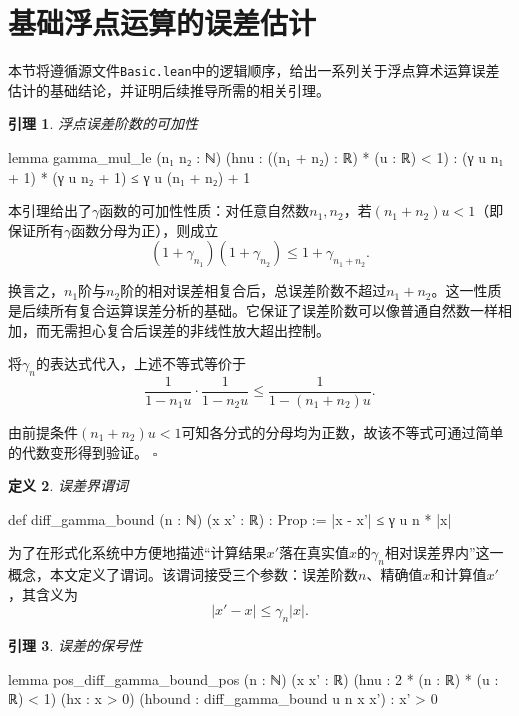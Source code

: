 ﻿\documentclass[UTF8,a4paper,openany]{ctexbook}
\theoremstyle{qrplain}
\newtheorem{definition}{定义}[chapter]
\newtheorem{lemma}[definition]{引理}
{}
\renewenvironment{proof}[1][证明]
{\par\noindent{\qrthmchinese\bfseries #1. }\ignorespaces}
{\hfill$\square$\par}
\begin{document}
\section{基础浮点运算的误差估计}

本节将遵循源文件\texttt{Basic.lean}中的逻辑顺序，给出一系列关于浮点算术运算误差估计的基础结论，并证明后续推导所需的相关引理。

\begin{lemma}
\label{lem:gamma-mul-le}
  浮点误差阶数的可加性
\end{lemma}
\begin{leancode}
  lemma gamma_mul_le (n₁ n₂ : ℕ) 
    (hnu : ((n₁ + n₂) : ℝ) * (u : ℝ) < 1) :
      (γ u n₁ + 1) * (γ u n₂ + 1) ≤ γ u (n₁ + n₂) + 1
\end{leancode}

本引理给出了$\gamma$函数的可加性性质：对任意自然数$n_1,n_2$，若$(n_1+n_2)u<1$（即保证所有$\gamma$函数分母为正），则成立
$$
(1+\gamma_{n_1})(1+\gamma_{n_2})\le 1+\gamma_{n_1+n_2}.
$$

换言之，$n_1$阶与$n_2$阶的相对误差相复合后，总误差阶数不超过$n_1+n_2$。这一性质是后续所有复合运算误差分析的基础。它保证了误差阶数可以像普通自然数一样相加，而无需担心复合后误差的非线性放大超出控制。

\begin{proof}
  将$\gamma_n$的表达式代入，上述不等式等价于
  $$
  \frac{1}{1-n_1u}\cdot\frac{1}{1-n_2u}\le\frac{1}{1-(n_1+n_2)u}.
  $$

  由前提条件$(n_1+n_2)u<1$可知各分式的分母均为正数，故该不等式可通过简单的代数变形得到验证。
\end{proof}

\begin{definition}
\label{def:diff-gamma-bound}
  误差界谓词
\end{definition}
\begin{leancode}
  def diff_gamma_bound (n : ℕ) (x x' : ℝ) : Prop :=
    |x - x'| ≤ γ u n * |x|
\end{leancode}

为了在形式化系统中方便地描述“计算结果$x'$落在真实值$x$的$\gamma_n$相对误差界内”这一概念，本文定义了谓词。该谓词接受三个参数：误差阶数$n$、精确值$x$和计算值$x'$，其含义为
$$
|x'-x|\le \gamma_n|x|.
$$

\begin{lemma}
  误差的保号性
\end{lemma}
\begin{leancode}
  lemma pos_diff_gamma_bound_pos (n : ℕ) (x x' : ℝ) 
    (hnu : 2 * (n : ℝ) * (u : ℝ) < 1) (hx : x > 0) 
    (hbound : diff_gamma_bound u n x x') :
      x' > 0 
\end{leancode}
\end{document}
